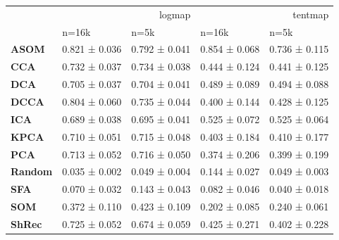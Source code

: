 \begin{tabular}{lllll}
\toprule
 & \multicolumn{2}{r}{logmap} & \multicolumn{2}{r}{tentmap} \\
 & n=16k & n=5k & n=16k & n=5k \\
\midrule
\textbf{ASOM} & 0.821 ± 0.036 & 0.792 ± 0.041 & 0.854 ± 0.068 & 0.736 ± 0.115 \\
\textbf{CCA} & 0.732 ± 0.037 & 0.734 ± 0.038 & 0.444 ± 0.124 & 0.441 ± 0.125 \\
\textbf{DCA} & 0.705 ± 0.037 & 0.704 ± 0.041 & 0.489 ± 0.089 & 0.494 ± 0.088 \\
\textbf{DCCA} & 0.804 ± 0.060 & 0.735 ± 0.044 & 0.400 ± 0.144 & 0.428 ± 0.125 \\
\textbf{ICA} & 0.689 ± 0.038 & 0.695 ± 0.041 & 0.525 ± 0.072 & 0.525 ± 0.064 \\
\textbf{KPCA} & 0.710 ± 0.051 & 0.715 ± 0.048 & 0.403 ± 0.184 & 0.410 ± 0.177 \\
\textbf{PCA} & 0.713 ± 0.052 & 0.716 ± 0.050 & 0.374 ± 0.206 & 0.399 ± 0.199 \\
\textbf{Random} & 0.035 ± 0.002 & 0.049 ± 0.004 & 0.144 ± 0.027 & 0.049 ± 0.003 \\
\textbf{SFA} & 0.070 ± 0.032 & 0.143 ± 0.043 & 0.082 ± 0.046 & 0.040 ± 0.018 \\
\textbf{SOM} & 0.372 ± 0.110 & 0.423 ± 0.109 & 0.202 ± 0.085 & 0.240 ± 0.061 \\
\textbf{ShRec} & 0.725 ± 0.052 & 0.674 ± 0.059 & 0.425 ± 0.271 & 0.402 ± 0.228 \\
\bottomrule
\end{tabular}
